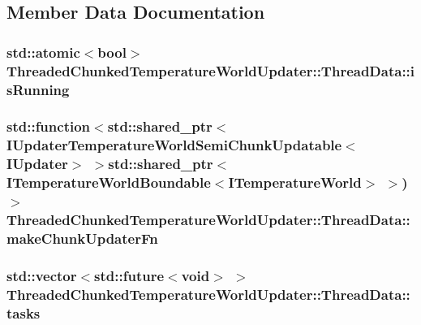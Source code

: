\subsection{Member Data Documentation}
\hypertarget{struct_threaded_chunked_temperature_world_updater_1_1_thread_data_a1c567a74e2d30e04a7b904697f5bc32d}{
\subsubsection[{is\-Running}]{\setlength{\rightskip}{0pt plus 5cm}std\-::atomic$<$bool$>$ Threaded\-Chunked\-Temperature\-World\-Updater\-::\-Thread\-Data\-::is\-Running}}\label{struct_threaded_chunked_temperature_world_updater_1_1_thread_data_a1c567a74e2d30e04a7b904697f5bc32d}
\hypertarget{struct_threaded_chunked_temperature_world_updater_1_1_thread_data_aa7026a20143b64b1b98030ea715f39d7}{
\subsubsection[{make\-Chunk\-Updater\-Fn}]{\setlength{\rightskip}{0pt plus 5cm}std\-::function$<$std\-::shared\-\_\-ptr$<${\bf I\-Updater\-Temperature\-World\-Semi\-Chunk\-Updatable}$<${\bf I\-Updater}$>$ $>$std\-::shared\-\_\-ptr$<${\bf I\-Temperature\-World\-Boundable}$<${\bf I\-Temperature\-World}$>$ $>$)$>$ Threaded\-Chunked\-Temperature\-World\-Updater\-::\-Thread\-Data\-::make\-Chunk\-Updater\-Fn}}\label{struct_threaded_chunked_temperature_world_updater_1_1_thread_data_aa7026a20143b64b1b98030ea715f39d7}
\hypertarget{struct_threaded_chunked_temperature_world_updater_1_1_thread_data_ab084ac0c15a2536095bef8c9297361f5}{
\subsubsection[{tasks}]{\setlength{\rightskip}{0pt plus 5cm}std\-::vector$<$std\-::future$<$void$>$ $>$ Threaded\-Chunked\-Temperature\-World\-Updater\-::\-Thread\-Data\-::tasks}}\label{struct_threaded_chunked_temperature_world_updater_1_1_thread_data_ab084ac0c15a2536095bef8c9297361f5}
